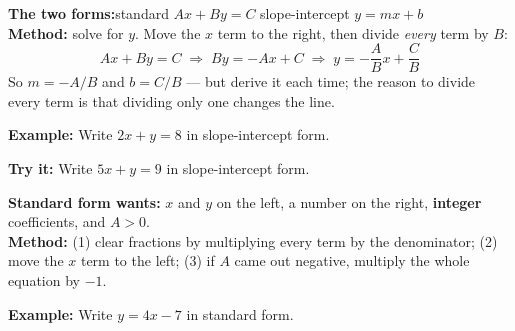 \documentclass[12pt]{article}
\begin{document}


\begin{formulabox}
\textbf{The two forms:}\quad standard $Ax + By = C$ \qquad slope-intercept $y = mx + b$\\[3pt]
\textbf{Method:} solve for $y$. Move the $x$ term to the right, then divide \emph{every}
term by $B$:
\[ Ax + By = C \;\Longrightarrow\; By = -Ax + C \;\Longrightarrow\; y = -\frac{A}{B}x + \frac{C}{B} \]
So $m = -A/B$ and $b = C/B$ --- but derive it each time; the reason to divide every term is
that dividing only one changes the line.
\end{formulabox}

\begin{examplebox}
\textbf{Example:} \quad Write $2x + y = 8$ in slope-intercept form.
\end{examplebox}

\begin{tryitbox}
\textbf{Try it:} \quad Write $5x + y = 9$ in slope-intercept form.\\[2pt]
\end{tryitbox}


\begin{formulabox}
\textbf{Standard form wants:} $x$ and $y$ on the left, a number on the right, \textbf{integer}
coefficients, and $A > 0$.\\[3pt]
\textbf{Method:} (1) clear fractions by multiplying every term by the denominator;
(2) move the $x$ term to the left; (3) if $A$ came out negative, multiply the whole equation
by $-1$.
\end{formulabox}

\begin{examplebox}
\textbf{Example:} \quad Write $y = 4x - 7$ in standard form.
\end{examplebox}
\end{document}
